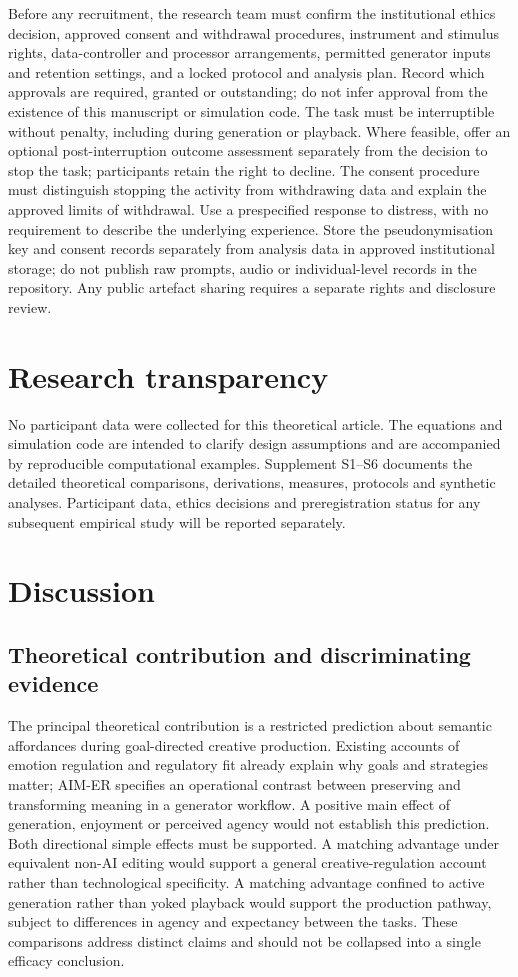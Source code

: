 \documentclass[11pt,a4paper]{article}
\begin{document}
Before any recruitment, the research team must confirm the institutional ethics decision, approved consent and withdrawal procedures, instrument and stimulus rights, data-controller and processor arrangements, permitted generator inputs and retention settings, and a locked protocol and analysis plan. Record which approvals are required, granted or outstanding; do not infer approval from the existence of this manuscript or simulation code. The task must be interruptible without penalty, including during generation or playback. Where feasible, offer an optional post-interruption outcome assessment separately from the decision to stop the task; participants retain the right to decline. The consent procedure must distinguish stopping the activity from withdrawing data and explain the approved limits of withdrawal. Use a prespecified response to distress, with no requirement to describe the underlying experience. Store the pseudonymisation key and consent records separately from analysis data in approved institutional storage; do not publish raw prompts, audio or individual-level records in the repository. Any public artefact sharing requires a separate rights and disclosure review.

\section{Research transparency}
No participant data were collected for this theoretical article. The equations and simulation code are intended to clarify design assumptions and are accompanied by reproducible computational examples. Supplement S1--S6 documents the detailed theoretical comparisons, derivations, measures, protocols and synthetic analyses. Participant data, ethics decisions and preregistration status for any subsequent empirical study will be reported separately.

\section{Discussion}

\subsection{Theoretical contribution and discriminating evidence}
The principal theoretical contribution is a restricted prediction about semantic affordances during goal-directed creative production. Existing accounts of emotion regulation and regulatory fit already explain why goals and strategies matter; AIM-ER specifies an operational contrast between preserving and transforming meaning in a generator workflow. A positive main effect of generation, enjoyment or perceived agency would not establish this prediction. Both directional simple effects must be supported. A matching advantage under equivalent non-AI editing would support a general creative-regulation account rather than technological specificity. A matching advantage confined to active generation rather than yoked playback would support the production pathway, subject to differences in agency and expectancy between the tasks. These comparisons address distinct claims and should not be collapsed into a single efficacy conclusion.
\end{document}
